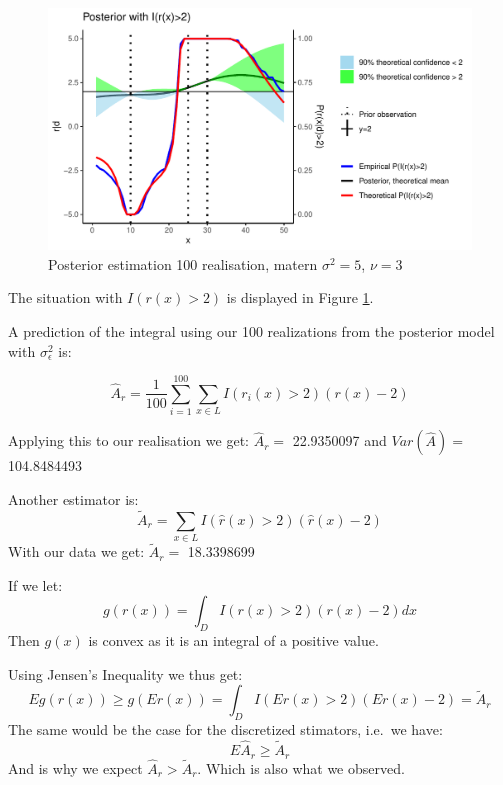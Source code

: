 \documentclass[]{article}
\begin{document}
\begin{figure}

{\centering \includegraphics{Exercise-1_files/figure-latex/fig1f1-1} 

}

\caption{\label{fig:fig1f1} Posterior estimation 100 realisation, matern $\sigma^2 = 5$, $\nu = 3$}\label{fig:fig1f1}
\end{figure}

The situation with \(I(r(x)>2)\) is displayed in Figure
\ref{fig:fig1f1}.

A prediction of the integral using our 100 realizations from the
posterior model with \(\sigma_\epsilon^2\) is:

\begin{equation}
    \hat{A}_r = \frac{1}{100}\sum_{i=1}^{100}\sum_{x\in L}I(r_i(x)>2)(r(x)-2)
\end{equation}

Applying this to our realisation we get: \(\hat A_r =\) 22.9350097 and
\(Var(\hat A) =\) 104.8484493

Another estimator is: \begin{equation}
    \tilde A_r = \sum_{x \in L} I(\hat r(x) > 2)(\hat r(x) - 2)
\end{equation} With our data we get: \(\tilde A_r =\) 18.3398699

If we let: \begin{equation}
    g(r(x)) = \int_D I(r(x) > 2)(r(x) - 2) dx
\end{equation} Then \(g(x)\) is convex as it is an integral of a
positive value.

Using Jensen's Inequality we thus get: \begin{equation}
 Eg(r(x)) \geq g(Er(x)) = \int_D I(Er(x) > 2)(Er(x) - 2) = \tilde A_r
\end{equation} The same would be the case for the discretized stimators,
i.e.~we have: \[E\hat A_r \geq \tilde A_r\] And is why we expect
\(\hat A_r > \tilde A_r\). Which is also what we observed.
\end{document}
